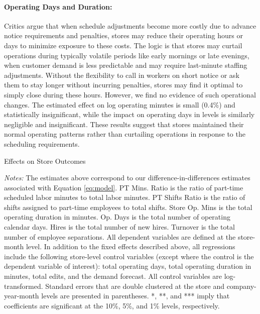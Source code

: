 \documentclass[letterpaper,11pt,leqno]{article}
\theoremstyle{paper}
\newcommand{\note}[2][]{\parbox{\textwidth}{\footnotesize\vspace*{10pt}\textit{#1}#2}}
\begin{document}
\paragraph{Operating Days and Duration:} Critics argue that when schedule adjustments become more costly due to advance notice requirements and penalties, stores may reduce their operating hours or days to minimize exposure to these costs. The logic is that stores may curtail operations during typically volatile periods like early mornings or late evenings, when customer demand is less predictable and may require last-minute staffing adjustments. Without the flexibility to call in workers on short notice or ask them to stay longer without incurring penalties, stores may find it optimal to simply close during these hours. However, we find no evidence of such operational changes. The estimated effect on log operating minutes is small (0.4\%) and statistically insignificant, while the impact on operating days in levels is similarly negligible and insignificant. These results suggest that stores maintained their normal operating patterns rather than curtailing operations in response to the scheduling requirements.


\begin{singlespace}
\begin{table}[h]
\caption{Effects on Store Outcomes}

\note{\textit{Notes: } \scriptsize The estimates above correspond to our difference-in-differences estimates associated with Equation \ref{eq:model}.
PT Mins. Ratio is the ratio of part-time scheduled labor minutes to total labor minutes. PT Shifts Ratio is the ratio of shifts assigned to part-time employees to total shifts. Store Op. Mins is the total operating duration in minutes. Op. Days is the total number of operating calendar days. Hires is the total number of new hires. Turnover is the total number of employee separations. All dependent variables are defined at the store-month level. In addition to the fixed effects described above, all regressions include the following store-level control variables (except where the control is the dependent variable of interest): total operating days, total operating duration in minutes, total edits, and the demand forecast. All control variables are log-transformed. Standard errors that are double clustered at the store and company-year-month levels are presented in parentheses. *, **, and *** imply that coefficients are significant at the 10\%, 5\%, and 1\% levels, respectively.}
\label{table:store_level}
\end{table}
\end{singlespace}
\end{document}
